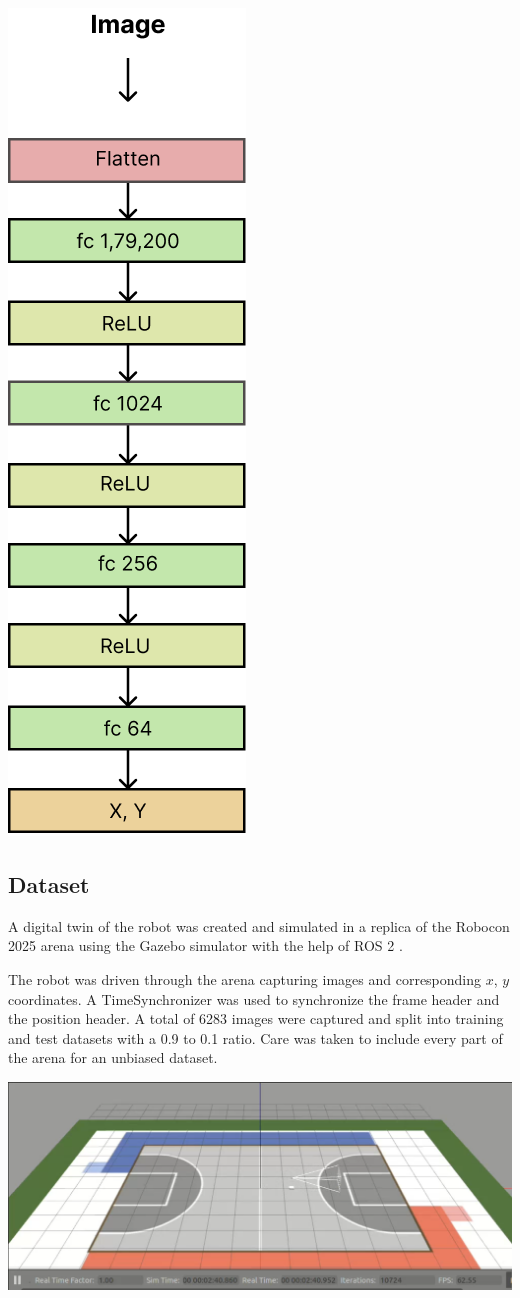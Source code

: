 \documentclass[a4paper]{article}
\begin{document}
\begin{multicols}{2}
{ \centering
 \includegraphics[width=0.2\columnwidth]{../results/model.png}\\
 \label{pinki}
}

\subsection{Dataset} 

\par \noindent
A digital twin of the robot was created and simulated in a replica of the Robocon 2025 arena 
using the Gazebo \cite{gazebo} simulator with the help of ROS 2 \cite{macenski2022ros2}. 

\par \noindent
The robot was driven through the arena capturing images and corresponding $x$, $y$ coordinates. A 
TimeSynchronizer was used to synchronize the frame header and the position header. A total of
6283 images were captured and split into training  and test datasets with a 0.9 to 0.1 ratio.
Care was taken to include every part of the arena for an unbiased dataset. 

{ \centering
 \includegraphics[scale=0.3]{../results/gazebo.png}\\
 \label{pinki}
}


\end{multicols}
\end{document}
